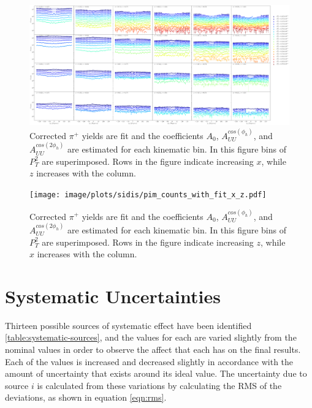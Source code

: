 \begin{figure}
	\centering
	\includegraphics[width=\textwidth]{image/plots/sidis/pip_counts_with_fit_x_z.pdf}	
	\caption[Corrected yield fits for $\pi^+$]{Corrected $\pi^+$ yields are fit and the coefficients $A_{0}$, $A_{UU}^{cos(\phi_h)}$, and $A_{UU}^{cos(2\phi_h)}$ are estimated for each kinematic bin.  In this figure bins of $P_T^2$ are superimposed.  Rows in the figure indicate increasing $x$, while $z$ increases with the column.}
		\label{fig:pip-datafit}

\end{figure}

\begin{figure}
	\centering
	\texttt{[image: image/plots/sidis/pim\_counts\_with\_fit\_x\_z.pdf]}	
	\caption[Corrected yield fits for $\pi^-$]{Corrected $\pi^+$ yields are fit and the coefficients $A_{0}$, $A_{UU}^{cos(\phi_h)}$, and $A_{UU}^{cos(2\phi_h)}$ are estimated for each kinematic bin.  In this figure bins of $P_T^2$ are superimposed.  Rows in the figure indicate increasing $z$, while $x$ increases with the column.}
		\label{fig:pim-datafit}

\end{figure}

\section{Systematic Uncertainties}
Thirteen possible sources of systematic effect have been identified \ref{table:systematic-sources}, and the values for each are varied slightly from the nominal values in order to observe the affect that each has on the final results.  Each of the values is increased and decreased slightly in accordance with the amount of uncertainty that exists around its ideal value.  The uncertainty due to source $i$ is calculated from these variations by calculating the RMS of the deviations, as shown in equation \ref{eqn:rms}.

